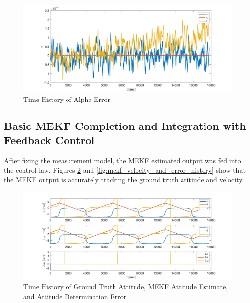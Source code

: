 \begin{figure}[H]
    \centering
    \captionsetup{ justification = centering}
    \includegraphics[width=15cm]{Images/PS10/alpha_history_PD_control.png}
    \caption{Time History of Alpha Error}
    \label{fig:alpha_history_with_full_wheel_model}
\end{figure}

\subsection{Basic MEKF Completion and Integration with Feedback Control}

After fixing the measurement model, the MEKF estimated output was fed into the control law. Figures \ref{fig:mekf_attitude_and_error_history} and \ref{fig:mekf_velocity_and_error_history} show that the MEKF output is accurately tracking the ground truth atitiude and velocity.

\begin{figure}[H]
    \centering
    \captionsetup{ justification = centering}
    \includegraphics[width=12cm]{Images/PS10/mult_ext_kalman_filter_attitude.png}
    \caption{Time History of Ground Truth Attitude, MEKF Attitude Estimate, and Attitude Determination Error}
    \label{fig:mekf_attitude_and_error_history}
\end{figure}

